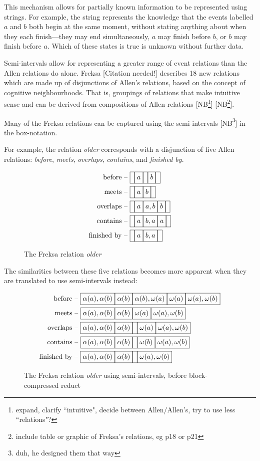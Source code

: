 \documentclass[a4paper,12pt,leqno]{article}
\newcommand{\vph}[1]{\vphantom{#1}}
\newcommand{\ebox}[1]{\fbox{$\vph{'(),}#1$}}
\newcommand{\nbBefore}[2]{\ebox{#1}\ebox{}\ebox{#2}}
\newcommand{\nbMeets}[2]{\ebox{#1}\ebox{#2}}
\newcommand{\nbOverlaps}[2]{\ebox{#1}\ebox{#1,#2}\ebox{#2}}
\newcommand{\nbDuring}[2]{\ebox{#2}\ebox{#1,#2}\ebox{#2}}
\newcommand{\nbFinishes}[2]{\ebox{#2}\ebox{#1,#2}}
\newcommand{\nbiDuring}[2]{\nbDuring{#2}{#1}}
\newcommand{\nbiFinishes}[2]{\nbFinishes{#2}{#1}}
\newcommand{\Before}[2]{\ebox{}\nbBefore{#1}{#2}\ebox{}}
\newcommand{\Meets}[2]{\ebox{}\nbMeets{#1}{#2}\ebox{}}
\newcommand{\Overlaps}[2]{\ebox{}\nbOverlaps{#1}{#2}\ebox{}}
\newcommand{\iDuring}[2]{\ebox{}\nbiDuring{#1}{#2}\ebox{}}
\newcommand{\iFinishes}[2]{\ebox{}\nbiFinishes{#1}{#2}\ebox{}}
\newcommand{\siBefore}[2]{\ebox{\alpha(#1),\alpha(#2)}\ebox{\alpha(#2)}\ebox{\alpha(#2),\omega(#1)}\ebox{\omega(#1)}\ebox{\omega(#1),\omega(#2)}}
\newcommand{\siMeets}[2]{\ebox{\alpha(#1),\alpha(#2)}\ebox{\alpha(#2)}\ebox{\omega(#1)}\ebox{\omega(#1),\omega(#2)}}
\newcommand{\siOverlaps}[2]{\ebox{\alpha(#1),\alpha(#2)}\ebox{\alpha(#2)}\ebox{}\ebox{\omega(#1)}\ebox{\omega(#1),\omega(#2)}}
\newcommand{\siiDuring}[2]{\ebox{\alpha(#1),\alpha(#2)}\ebox{\alpha(#2)}\ebox{}\ebox{\omega(#2)}\ebox{\omega(#1),\omega(#2)}}
\newcommand{\siiFinishes}[2]{\ebox{\alpha(#1),\alpha(#2)}\ebox{\alpha(#2)}\ebox{}\ebox{\omega(#1),\omega(#2)}}
\newcommand{\EventString}[1]{
	\renewcommand*{\do}[1]{\ebox{##1}}%
	\PipeParser{#1}
}
\newcommand{\citeneeded}[1][]{{\color{red}[Citation needed!#1]}}
\newcommand{\selfnote}[1]{{\color{red}[NB\footnote{{\color{red}#1}}]}}
\newcommand{\nb}{\selfnote}
\begin{document}
This mechanism allows for partially known information to be represented using strings. For example, the string \EventString{\alpha(a), \alpha(b)|{}} represents the knowledge that the events labelled $a$ and $b$ both begin at the same moment, without stating anything about when they each finish---they may end simultaneously, $a$ may finish before $b$, or $b$ may finish before $a$. Which of these states is true is unknown without further data.

Semi-intervals allow for representing a greater range of event relations than the Allen relations do alone. Freksa \citeneeded{} describes 18 new relations which are made up of disjunctions of Allen's relations, based on the concept of cognitive neighbourhoods. That is, groupings of relations that make intuitive sense and can be derived from compositions of Allen relations \nb{expand, clarify ``intuitive", decide between Allen/Allen's, try to use less ``relations"?} \nb{include table or graphic of Freksa's relations, eg p18 or p21}.

Many of the Freksa relations can be captured using the semi-intervals \nb{duh, he designed them that way} in the box-notation.

For example, the relation \textit{older} corresponds with a disjunction of five Allen relations: \textit{before}, \textit{meets}, \textit{overlaps}, \textit{contains}, and \textit{finished by}.
\begin{figure}[h]
	\begin{align*}
	\text{before -- }&\Before{a}{b}\\
	\text{meets -- }&\Meets{a}{b}\\
	\text{overlaps -- }&\Overlaps{a}{b}\\
	\text{contains -- }&\iDuring{a}{b}\\
	\text{finished by -- }&\iFinishes{a}{b}
	\end{align*}
	\caption{The Freksa relation \textit{older}}
\end{figure}
The similarities between these five relations becomes more apparent when they are translated to use semi-intervals instead:
\begin{figure}[h]
	\begin{align*}
	\text{before -- }&\siBefore{a}{b}\\
	\text{meets -- }&\siMeets{a}{b}\\
	\text{overlaps -- }&\siOverlaps{a}{b}\\
	\text{contains -- }&\siiDuring{a}{b}\\
	\text{finished by -- }&\siiFinishes{a}{b}
	\end{align*}
	\caption{The Freksa relation \textit{older} using semi-intervals, before block-compressed reduct}
\end{figure}
\end{document}

